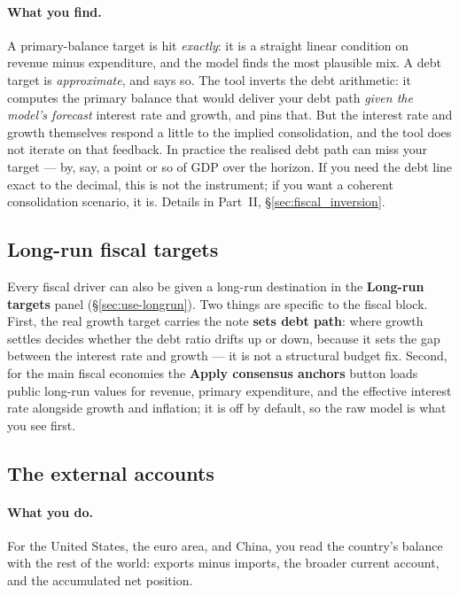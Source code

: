 \documentclass[11pt]{article}
\theoremstyle{definition}
\theoremstyle{remark}
\begin{document}
\paragraph{What you find.} A primary-balance target is hit \emph{exactly}: it is a straight
linear condition on revenue minus expenditure, and the model finds the most plausible mix. A
debt target is \emph{approximate}, and says so. The tool inverts the debt arithmetic: it
computes the primary balance that would deliver your debt path \emph{given the model's forecast}
interest rate and growth, and pins that. But the interest rate and growth themselves respond a
little to the implied consolidation, and the tool does not iterate on that feedback. In practice
the realised debt path can miss your target --- by, say, a point or so of GDP over the horizon.
If you need the debt line exact to the decimal, this is not the instrument; if you want
a coherent consolidation scenario, it is. Details in Part~II, \S\ref{sec:fiscal_inversion}.

\subsection{Long-run fiscal targets}

Every fiscal driver can also be given a long-run destination in the \textbf{Long-run targets}
panel (\S\ref{sec:use-longrun}). Two things are specific to the fiscal block. First, the real
growth target carries the note \textbf{sets debt path}: where growth settles decides whether
the debt ratio drifts up or down, because it sets the gap between the interest rate and growth
--- it is not a structural budget fix. Second, for the main fiscal economies the
\textbf{Apply consensus anchors} button loads public long-run values for revenue, primary
expenditure, and the effective interest rate alongside growth and inflation; it is off by
default, so the raw model is what you see first.

\subsection{The external accounts}

\paragraph{What you do.} For the United States, the euro area, and China, you read the
country's balance with the rest of the world: exports minus imports, the broader current
account, and the accumulated net position.
\end{document}
